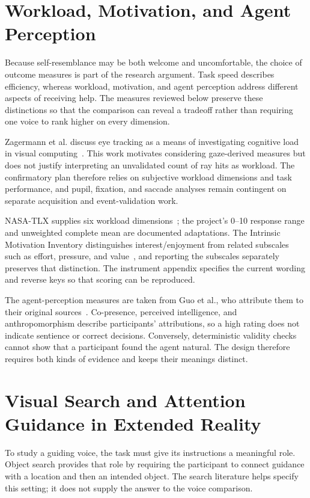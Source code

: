 \section{Workload, Motivation, and Agent Perception}
Because self-resemblance may be both welcome and uncomfortable, the choice of outcome measures is part of the research argument. Task speed describes efficiency, whereas workload, motivation, and agent perception address different aspects of receiving help. The measures reviewed below preserve these distinctions so that the comparison can reveal a tradeoff rather than requiring one voice to rank higher on every dimension.

Zagermann et al. discuss eye tracking as a means of investigating cognitive load in visual computing~\cite{zagermann2016workload}. This work motivates considering gaze-derived measures but does not justify interpreting an unvalidated count of ray hits as workload. The confirmatory plan therefore relies on subjective workload dimensions and task performance, and pupil, fixation, and saccade analyses remain contingent on separate acquisition and event-validation work.

NASA-TLX supplies six workload dimensions~\cite{hart1988nasatlx}; the project's 0--10 response range and unweighted complete mean are documented adaptations. The Intrinsic Motivation Inventory distinguishes interest/enjoyment from related subscales such as effort, pressure, and value~\cite{ryan1982control,mcauley1989imi,csdtIMI}, and reporting the subscales separately preserves that distinction. The instrument appendix specifies the current wording and reverse keys so that scoring can be reproduced.

The agent-perception measures are taken from Guo et al., who attribute them to their original sources~\cite{guo2024doppelganger,biocca2001networked,moussawi2019perception}. Co-presence, perceived intelligence, and anthropomorphism describe participants' attributions, so a high rating does not indicate sentience or correct decisions. Conversely, deterministic validity checks cannot show that a participant found the agent natural. The design therefore requires both kinds of evidence and keeps their meanings distinct.


\section{Visual Search and Attention Guidance in Extended Reality}
To study a guiding voice, the task must give its instructions a meaningful role. Object search provides that role by requiring the participant to connect guidance with a location and then an intended object. The search literature helps specify this setting; it does not supply the answer to the voice comparison.

